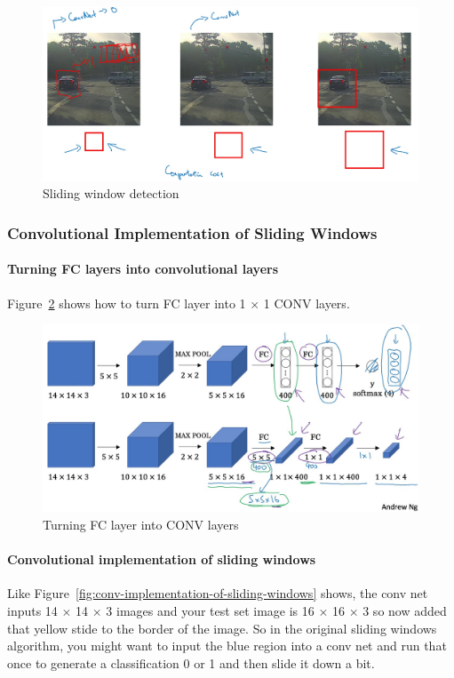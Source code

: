 \documentclass[UTF8]{article}
\begin{document}
\begin{figure}[htb]
    \centering
    \includegraphics[width=40em]{figures/sliding-window-detection}
    \caption{Sliding window detection}
    \label{fig:sliding-window-detection}
\end{figure}

\subsubsection{Convolutional Implementation of Sliding Windows}
\paragraph{Turning FC layers into convolutional layers}
Figure~\ref{fig:turning-fc-layer-into-conv-layers} shows how to turn FC layer into 1 $\times$ 1
CONV layers.

\begin{figure}[htb]
    \centering
    \includegraphics[width=40em]{figures/turning-fc-layer-into-conv-layers}
    \caption{Turning FC layer into CONV layers}
    \label{fig:turning-fc-layer-into-conv-layers}
\end{figure}

\paragraph{Convolutional implementation of sliding windows}
Like Figure~\ref{fig:conv-implementation-of-sliding-windows} shows, the conv net inputs 14 $\times$
14 $\times$ 3 images and your test set image is 16 $\times$ 16 $\times$ 3 so now added that yellow
stide to the border of the image. So in the original sliding windows algorithm, you might want to
input the blue region into a conv net and run that once to generate a classification 0 or 1 and
then slide it down a bit.
\end{document}
